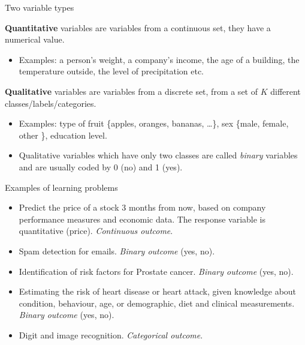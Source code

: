 \documentclass[ignorenonframetext,]{beamer}
\providecommand{\tightlist}{%
  \setlength{\itemsep}{0pt}\setlength{\parskip}{0pt}}
\begin{document}
\begin{frame}

\begin{block}{Two variable types}

\vspace{2mm}

\textbf{Quantitative} variables are variables from a continuous set,
they have a numerical value.

\begin{itemize}
\tightlist
\item
  Examples: a person's weight, a company's income, the age of a
  building, the temperature outside, the level of precipitation etc.
\end{itemize}

\vspace{4mm}

\textbf{Qualitative} variables are variables from a discrete set, from a
set of \(K\) different classes/labels/categories.

\begin{itemize}
\item
  Examples: type of fruit \{apples, oranges, bananas, \ldots{}\}, sex
  \{male, female, other \}, education level.
\item
  Qualitative variables which have only two classes are called
  \emph{binary} variables and are usually coded by 0 (no) and 1 (yes).
\end{itemize}

\end{block}

\end{frame}

\begin{frame}{Examples of learning problems}
\protect\hypertarget{examples-of-learning-problems}{}

\begin{itemize}
\item
  Predict the price of a stock 3 months from now, based on company
  performance measures and economic data. The response variable is
  quantitative (price). \emph{Continuous outcome}.
\item
  Spam detection for emails. \emph{Binary outcome} (yes, no).
\item
  Identification of risk factors for Prostate cancer. \emph{Binary
  outcome} (yes, no).
\item
  Estimating the risk of heart disease or heart attack, given knowledge
  about condition, behaviour, age, or demographic, diet and clinical
  measurements. \emph{Binary outcome} (yes, no).
\item
  Digit and image recognition. \emph{Categorical outcome}.
\end{itemize}

\end{frame}
\end{document}
